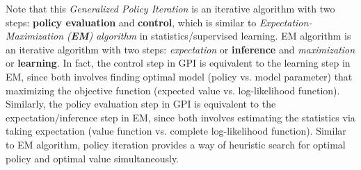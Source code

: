 \documentclass[11pt]{article}
\begin{document}
Note that this \emph{Generalized Policy Iteration} is an iterative algorithm with two steps: \textbf{policy evaluation} and \textbf{control}, which is similar to \emph{Expectation-Maximization (\textbf{EM}) algorithm} in statistics/supervised learning. EM algorithm is an iterative algorithm with two steps: \emph{expectation} or \textbf{inference} and \emph{maximization} or \textbf{learning}. In fact, the control step in GPI is equivalent to the learning step in EM, since both involves finding optimal model (policy vs. model parameter) that maximizing the objective function (expected value vs. log-likelihood function).  Similarly, the policy evaluation step in GPI is equivalent to the expectation/inference step in EM, since both involves estimating the statistics via taking expectation (value function vs. complete log-likelihood function). Similar to EM algorithm, policy iteration provides a way of heuristic search for optimal policy and optimal value simultaneously. 


\newpage


\end{document}
